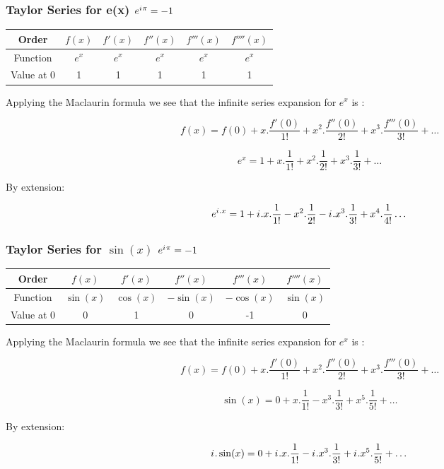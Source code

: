 \documentclass[10pt]{beamer}
\newcommand{\iu}{{i\mkern1mu}}
\begin{document}
\begin{frame}
	\frametitle{Taylor Series for e(x) \hspace{25pt} \textcolor{pink}{\Huge\(e^{\iu \pi} = -1\)}}
	\begin{center}
		\begin{tabular}{|c|c|c|c|c|c|}
			\hline
			Order &$f(x)$ & $f'(x)$ & $f''(x)$ & $f'''(x)$ & $f''''(x)$ \\
			\hline
			Function & $e^x$  & $e^x$   & $e^x$    & $e^x$     & $e^x$      \\
			\hline
			Value at 0 & 1      & 1       & 1        & 1         & 1          \\
			\hline
		\end{tabular}
	\end{center}
	\vspace{20pt}
	Applying the Maclaurin formula we see that the infinite series expansion for $e^x$ is :

	\large $$f(x) = f(0)+x.\dfrac{f'(0)}{1!}+ x^2.\dfrac{f''(0)}{2!} +x^3.\dfrac{f'''(0)}{3!} + \dots$$

	\large $$e^x = 1+x.\dfrac{1}{1!}+ x^2.\dfrac{1}{2!} +x^3.\dfrac{1}{3!} + \dots$$

	By extension:

	\large $$e^{{\iu}.x} = 1+\iu.x.\dfrac{1}{1!}- x^2.\dfrac{1}{2!} -\iu.x^3.\dfrac{1}{3!} + x^4.\dfrac{1}{4!} \dots$$


\end{frame}

\begin{frame}
	\frametitle{Taylor Series for $\sin(x)$ \hspace{25pt} \textcolor{pink}{\Huge\(e^{\iu \pi} = -1\)}}
	\begin{center}
		\begin{tabular}{|c|c|c|c|c|c|}
			\hline
			Order & \(f(x)\)    & \(f'(x)\)   & \(f''(x)\)   & \(f'''(x)\)  & \(f''''(x)\) \\
			\hline
			Function & \(\sin(x)\) & \(\cos(x)\) & \(-\sin(x)\) & \(-\cos(x)\) & \(\sin(x)\)  \\
			\hline
			Value at 0 & 0           & 1           & 0            & -1           & 0            \\
			\hline
		\end{tabular}
	\end{center}
	\vspace{20pt}
	Applying the Maclaurin formula we see that the infinite series expansion for $e^x$ is :

	\large $$f(x) = f(0)+x.\dfrac{f'(0)}{1!}+ x^2.\dfrac{f''(0)}{2!} +x^3.\dfrac{f'''(0)}{3!} + \dots$$

	\large $$\sin(x) = 0+x.\dfrac{1}{1!} -x^3.\dfrac{1}{3!} + x^5.\dfrac{1}{5!} +\dots$$
	
	By extension: 
	
	\large $$\iu.\sin(x) = 0+\iu.x.\dfrac{1}{1!} -\iu.x^3.\dfrac{1}{3!} + \iu.x^5.\dfrac{1}{5!} +\dots$$

\end{frame}
\end{document}
